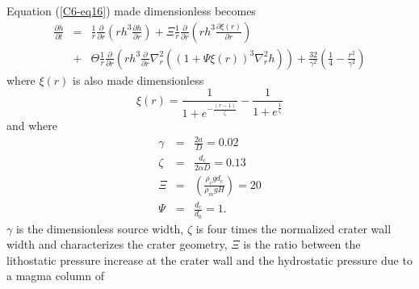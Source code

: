 Equation (\ref{C6-eq16}) made dimensionless becomes
\begin{eqnarray}    \frac{\partial     h}{\partial    t}&=&\frac{1}{r}
  \frac{\partial}{\partial r}\left  (rh^{3} \frac{\partial h}{\partial
      r} \right)+ \Xi \frac{1}{r} \frac{\partial}{\partial r}\left
                                                            (   rh^{3}\frac{\partial    \xi(r)}{\partial   r}\right   )\nonumber\\
                                                        &+&\Theta
                                                            \frac{1}{r}\frac{\partial}{\partial
                                                            r}\left
                                                            (   rh^{3}
                                                            \frac{\partial}{\partial
                                                            r}
                                                            \nabla^{2}_{r}\left
                                                            ((1+\Psi
                                                            \xi(r))^{3}\nabla^{2}_{r}h
                                                            \right )\right)+
                                                            \frac{32}{\gamma^{2}}
                                                            \left(\frac{1}{4}-\frac{r^{2}}{\gamma^{2}}\right)
                                                            \label{C6-eq21}
\end{eqnarray}
where $\xi(r)$ is also made dimensionless
\begin{equation}
  \xi(r)=\frac{1}{1+e^{-\frac{(r-1)}{\zeta}}}-\frac{1}{1+e^{\frac{1}{\zeta}}}\label{C6-eqqqq}
\end{equation}
and where
\begin{eqnarray}
  \label{C6-Dimensionless1} 
  \gamma&=&\frac{2a}{D}= 0.02\label{C6-n1}\\
  \zeta&=&\frac{d_c}{2\alpha D}=0.13
           \label{C6-n2}\\ \Xi&=&
                               \left(\frac{\rho_{c}gd_{c}}{\rho_{m}gH}\right )
                               = 20 \label{C6-n3}\\
  \Psi&=&\frac{d_{c}}{d_0} = 1\label{C6-n4}. 
\end{eqnarray}
$\gamma$ is the dimensionless source  width, $\zeta$ is four times the
normalized crater  wall width  and characterizes the  crater geometry,
$\Xi$ is  the ratio between  the lithostatic pressure increase  at the
crater wall  and the  hydrostatic pressure  due to  a magma  column of
